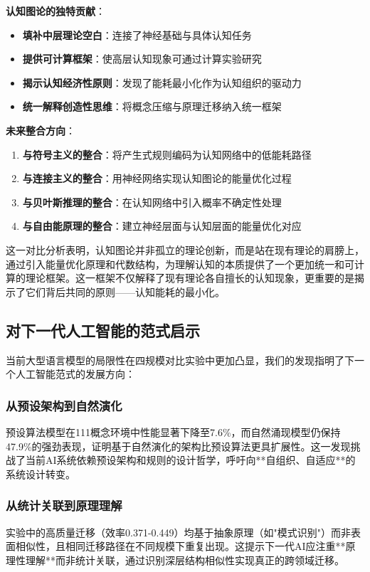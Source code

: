 \documentclass[12pt,a4paper]{article}
\begin{document}
\textbf{认知图论的独特贡献}：
\begin{itemize}
\item \textbf{填补中层理论空白}：连接了神经基础与具体认知任务
\item \textbf{提供可计算框架}：使高层认知现象可通过计算实验研究
\item \textbf{揭示认知经济性原则}：发现了能耗最小化作为认知组织的驱动力
\item \textbf{统一解释创造性思维}：将概念压缩与原理迁移纳入统一框架
\end{itemize}

\textbf{未来整合方向}：
\begin{enumerate}
\item \textbf{与符号主义的整合}：将产生式规则编码为认知网络中的低能耗路径
\item \textbf{与连接主义的整合}：用神经网络实现认知图论的能量优化过程
\item \textbf{与贝叶斯推理的整合}：在认知网络中引入概率不确定性处理
\item \textbf{与自由能原理的整合}：建立神经层面与认知层面的能量优化对应
\end{enumerate}

这一对比分析表明，认知图论并非孤立的理论创新，而是站在现有理论的肩膀上，通过引入能量优化原理和代数结构，为理解认知的本质提供了一个更加统一和可计算的理论框架。这一框架不仅解释了现有理论各自擅长的认知现象，更重要的是揭示了它们背后共同的原则——认知能耗的最小化。


\subsection{对下一代人工智能的范式启示}

当前大型语言模型的局限性在四规模对比实验中更加凸显，我们的发现指明了下一个人工智能范式的发展方向：

\subsubsection{从预设架构到自然演化}
预设算法模型在111概念环境中性能显著下降至7.6\%，而自然涌现模型仍保持47.9\%的强劲表现，证明基于自然演化的架构比预设算法更具扩展性。这一发现挑战了当前AI系统依赖预设架构和规则的设计哲学，呼吁向**自组织、自适应**的系统设计转变。

\subsubsection{从统计关联到原理理解}
实验中的高质量迁移（效率0.371-0.449）均基于抽象原理（如"模式识别"）而非表面相似性，且相同迁移路径在不同规模下重复出现。这提示下一代AI应注重**原理性理解**而非统计关联，通过识别深层结构相似性实现真正的跨领域迁移。
\end{document}
